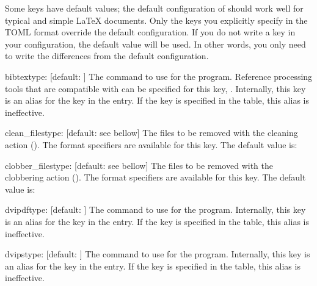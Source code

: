 \documentclass[draft]{llmk-doc}
\begin{document}
Some keys have default values; the default configuration of  should
work well for typical and simple {\LaTeX} documents. Only the keys you
explicitly specify in the TOML format override the default configuration. If
you do not write a key in your configuration, the default value will be used.
In other words, you only need to write the differences from the default
configuration.

\begin{confkey}{bibtex}{type: }[default: ]
The command to use for the  program. Reference processing
tools that are compatible with {\BibTeX} can be specified for this key, \eg
{}. Internally, this key is an alias for the  key in
the  entry. If the  key is specified in the
 table, this alias is ineffective.
\end{confkey}

\begin{confkey}{clean\_files}{type: }
  [default: see bellow]
The files to be removed with the cleaning action (). The format
specifiers are available for this key. The default value is:
%
\begin{htcode}
[
  "%
  "%
]
\end{htcode}
\end{confkey}

\begin{confkey}{clobber\_files}{type: }
  [default: see bellow]
The files to be removed with the clobbering action (). The format
specifiers are available for this key. The default value is:
%
\end{confkey}

\begin{confkey}{dvipdf}{type: }[default: ]
The command to use for the  program. Internally, this key is
an alias for the  key in the  entry. If the
 key is specified in the  table, this alias is
ineffective.
\end{confkey}

\begin{confkey}{dvips}{type: }[default: ]
The command to use for the  program. Internally, this key is an
alias for the  key in the  entry. If the
 key is specified in the  table, this alias is
ineffective.
\end{confkey}
\end{document}
